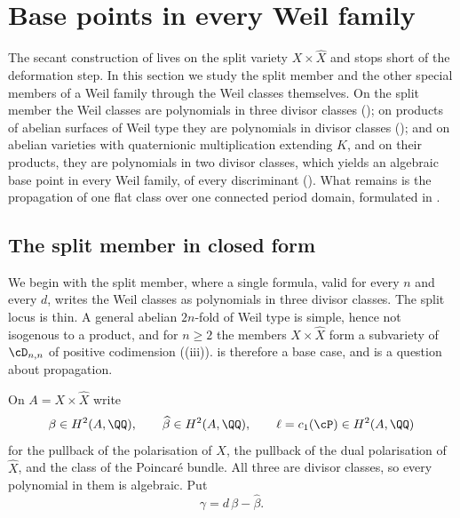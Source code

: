 \section{Base points in every Weil family}\label{sec:basepoints}

The secant construction of  lives on the split variety
$X\times\widehat{X}$ and stops short of the deformation step. In this section
we study the split member and the other special members of a Weil family
through the Weil classes themselves. On the split member the Weil classes are
polynomials in three divisor classes (); on products of
abelian surfaces of Weil type they are polynomials in divisor classes
(); and on abelian varieties with quaternionic
multiplication extending $K$, and on their products, they are polynomials in
two divisor classes, which yields an algebraic base point in every Weil
family, of every discriminant (). What remains is the
propagation of one flat class over one connected period domain, formulated
in .

\subsection{The split member in closed form}\label{ssec:split}

We begin with the split member, where a single formula, valid for every $n$
and every $d$, writes the Weil classes as polynomials in three divisor
classes. The split locus is thin. A general abelian $2n$-fold
of Weil type is simple, hence not isogenous to a product, and for $n\ge2$ the
members $X\times\widehat{X}$ form a subvariety of $\cD_{n,n}$ of positive
codimension ((iii)).  is
therefore a base case, and  is a question about propagation.

\begin{notation}\label{not:threeclasses}
On $A=X\times\widehat{X}$ write
\[
  \beta\in H^{2}(A,\QQ),
  \qquad
  \widehat{\beta}\in H^{2}(A,\QQ),
  \qquad
  \ell=c_{1}(\cP)\in H^{2}(A,\QQ)
\]
for the pullback of the polarisation of $X$, the pullback of the dual
polarisation of $\widehat{X}$, and the class of the Poincar\'e bundle. All
three are divisor classes, so every polynomial in them is algebraic. Put
\begin{equation}\label{eq:gammadef}
  \gamma=d\,\beta-\widehat{\beta}.
\end{equation}
\end{notation}

